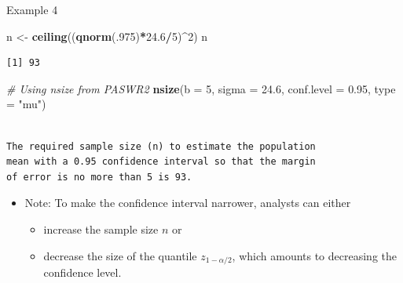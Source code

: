 \documentclass[
  ignorenonframetext,
]{beamer}
\newenvironment{Shaded}{\begin{snugshade}}{\end{snugshade}}
\newcommand{\AttributeTok}[1]{\textcolor[rgb]{0.13,0.29,0.53}{#1}}
\newcommand{\CommentTok}[1]{\textcolor[rgb]{0.56,0.35,0.01}{\textit{#1}}}
\newcommand{\DecValTok}[1]{\textcolor[rgb]{0.00,0.00,0.81}{#1}}
\newcommand{\FloatTok}[1]{\textcolor[rgb]{0.00,0.00,0.81}{#1}}
\newcommand{\FunctionTok}[1]{\textcolor[rgb]{0.13,0.29,0.53}{\textbf{#1}}}
\newcommand{\NormalTok}[1]{#1}
\newcommand{\OtherTok}[1]{\textcolor[rgb]{0.56,0.35,0.01}{#1}}
\newcommand{\SpecialCharTok}[1]{\textcolor[rgb]{0.81,0.36,0.00}{\textbf{#1}}}
\newcommand{\StringTok}[1]{\textcolor[rgb]{0.31,0.60,0.02}{#1}}
\providecommand{\tightlist}{%
  \setlength{\itemsep}{0pt}\setlength{\parskip}{0pt}}
\begin{document}
\begin{frame}[fragile]{Example 4}
\protect\hypertarget{example-4-1}{}
\normalsize

\begin{Shaded}
\begin{Highlighting}[]
\NormalTok{n }\OtherTok{\textless{}{-}} \FunctionTok{ceiling}\NormalTok{((}\FunctionTok{qnorm}\NormalTok{(.}\DecValTok{975}\NormalTok{)}\SpecialCharTok{*}\FloatTok{24.6}\SpecialCharTok{/}\DecValTok{5}\NormalTok{)}\SpecialCharTok{\^{}}\DecValTok{2}\NormalTok{)}
\NormalTok{n}
\end{Highlighting}
\end{Shaded}

\begin{verbatim}
[1] 93
\end{verbatim}

\begin{Shaded}
\begin{Highlighting}[]
\CommentTok{\# Using nsize from PASWR2}
\FunctionTok{nsize}\NormalTok{(}\AttributeTok{b =} \DecValTok{5}\NormalTok{, }\AttributeTok{sigma =} \FloatTok{24.6}\NormalTok{, }\AttributeTok{conf.level =} \FloatTok{0.95}\NormalTok{, }\AttributeTok{type =} \StringTok{"mu"}\NormalTok{)}
\end{Highlighting}
\end{Shaded}

\begin{verbatim}

The required sample size (n) to estimate the population 
mean with a 0.95 confidence interval so that the margin 
of error is no more than 5 is 93.
\end{verbatim}

\normalsize

\begin{itemize}
\item
  Note: To make the confidence interval narrower, analysts can either

  \begin{itemize}
  \tightlist
  \item
    increase the sample size \(n\) or
  \item
    decrease the size of the quantile \(z_{1-\alpha/2}\), which amounts
    to decreasing the confidence level.
  \end{itemize}
\end{itemize}
\end{frame}
\end{document}
